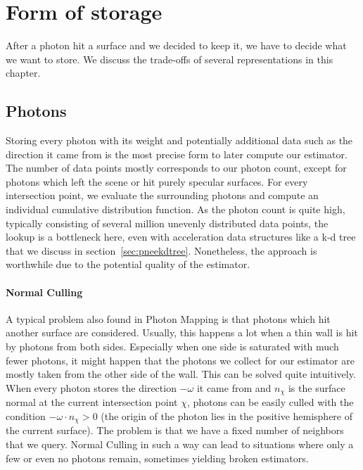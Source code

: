 \section{Form of storage}
\label{ch:formofstorage}

After a photon hit a surface and we decided to keep it, we have to decide what we want to store. We discuss the trade-offs of several representations in this chapter. 

\subsection{Photons}

Storing every photon with its weight and potentially additional data such as the direction it came from is the most precise form to later compute our estimator. The number of data points mostly corresponds to our photon count, except for photons which left the scene or hit purely specular surfaces. For every intersection point, we evaluate the surrounding photons and compute an individual cumulative distribution function. As the photon count is quite high, typically consisting of several million unevenly distributed data points, the lookup is a bottleneck here, even with acceleration data structures like a k-d tree that we discuss in section~\ref{sec:pneekdtree}. Nonetheless, the approach is worthwhile due to the potential quality of the estimator.

\paragraph*{Normal Culling}
\label{ch:normalculling}

A typical problem also found in Photon Mapping is that photons which hit another surface are considered. Usually, this happens a lot when a thin wall is hit by photons from both sides. Especially when one side is saturated with much fewer photons, it might happen that the photons we collect for our estimator are mostly taken from the other side of the wall. This can be solved quite intuitively. When every photon stores the direction $-\omega$ it came from and $n_{\chi}$ is the surface normal at the current intersection point $\chi$, photons can be easily culled with the condition $-\omega\cdot n_{\chi} > 0$ (the origin of the photon lies in the positive hemisphere of the current surface). The problem is that we have a fixed number of neighbors that we query. Normal Culling in such a way can lead to situations where only a few or even no photons remain, sometimes yielding broken estimators.

